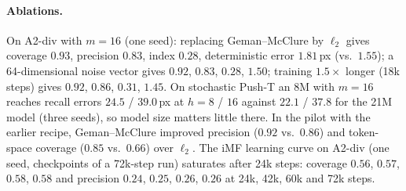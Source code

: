 \begin{table}[h]
\caption{Recipe comparisons on A2-div ($K{=}4$, pilot and preparation runs, one seed; bootstrap 95\% intervals over 400 contexts where given). Training hours are on a shared GPU.}
\label{tab:recipe}
\begin{center}
\small
{}
\end{center}
\end{table}

\paragraph{Ablations.}
\label{app:ablation}
On A2-div with $m{=}16$ (one seed): replacing Geman--McClure by $\ell_2$ gives coverage $0.93$, precision $0.83$, index $0.28$, deterministic error $1.81$\,px (vs.\ $1.55$); a 64-dimensional noise vector gives $0.92$, $0.83$, $0.28$, $1.50$; training $1.5\times$ longer (18k steps) gives $0.92$, $0.86$, $0.31$, $1.45$. On stochastic Push-T an 8M \imlewm{} with $m{=}16$ reaches recall errors $24.5$ / $39.0$\,px at $h = 8$ / $16$ against $22.1$ / $37.8$ for the 21M model (three seeds), so model size matters little there. In the pilot with the earlier recipe, Geman--McClure improved precision ($0.92$ vs.\ $0.86$) and token-space coverage ($0.85$ vs.\ $0.66$) over $\ell_2$. The iMF learning curve on A2-div (one seed, checkpoints of a 72k-step run) saturates after 24k steps: coverage $0.56$, $0.57$, $0.58$, $0.58$ and precision $0.24$, $0.25$, $0.26$, $0.26$ at 24k, 42k, 60k and 72k steps.


